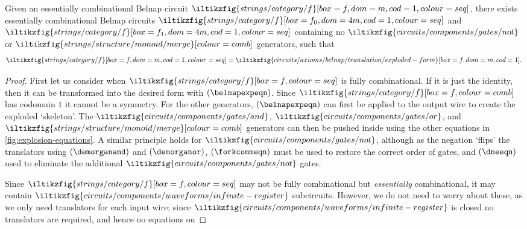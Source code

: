 \begin{proposition}\label{prop:exploded-belnap}
    Given an essentially combinational Belnap circuit \(
    \iltikzfig{strings/category/f}[box=f,dom=m,cod=1,colour=seq]
    \), there exists essentially combinational Belnap circuits \(
    \iltikzfig{strings/category/f}[box=f_0,dom=4m,cod=1,colour=seq]
    \) and \(
    \iltikzfig{strings/category/f}[box=f_1,dom=4m,cod=1,colour=seq]
    \) containing no \(
    \iltikzfig{circuits/components/gates/not}
    \) or \(
    \iltikzfig{strings/structure/monoid/merge}[colour=comb]
    \) generators, such that \[
        \iltikzfig{strings/category/f}[box=f,dom=m,cod=1,colour=seq]
        =
        \iltikzfig{circuits/axioms/belnap/translation/exploded-form}[box=f,dom=m,cod=1].
    \]
\end{proposition}
\begin{proof}
    First let us consider when \(
    \iltikzfig{strings/category/f}[box=f,colour=seq]
    \) is fully combinational.
    If it is just the identity, then it can be transformed into the desired form
    with
    \((\belnapexpeqn)\).
    Since \(\iltikzfig{strings/category/f}[box=f,colour=comb]\) has codomain
    \(1\) it cannot be a symmetry.
    For the other generators, \((\belnapexpeqn)\) can first be
    applied to the output wire to create the exploded `skeleton'.
    The \(
    \iltikzfig{circuits/components/gates/and}
    \), \(
    \iltikzfig{circuits/components/gates/or}
    \), and \(
    \iltikzfig{strings/structure/monoid/merge}[colour=comb]
    \) generators can then be pushed inside using the other equations in
    \cref{fig:explosion-equations}.
    A similar principle holds for \(
    \iltikzfig{circuits/components/gates/not}
    \), although as the negation `flips' the translators using
    \((\demorganand)\) and \((\demorganor)\), \((\forkcommeqn)\) must be used to
    restore the correct order of gates, and \((\dneeqn)\) used to eliminate the
    additional \(\iltikzfig{circuits/components/gates/not}\) gates.

    Since \(
    \iltikzfig{strings/category/f}[box=f,colour=seq]
    \) may not be fully combinational but \emph{essentially} combinational, it
    may contain \(
    \iltikzfig{circuits/components/waveforms/infinite-register}
    \) subcircuits.
    However, we do not need to worry about these, as we only need translators
    for each input wire; since \(
    \iltikzfig{circuits/components/waveforms/infinite-register}
    \) is closed no translators are required, and hence no equations on


\end{proof}
